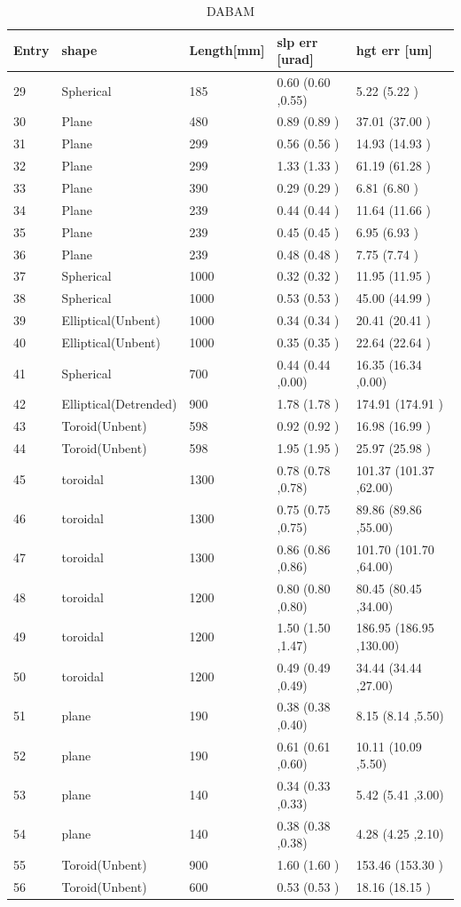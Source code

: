 \documentclass[../main.tex]{subfiles}
\begin{document}
	\begin{table}[h!]
	\centering
	\caption{DABAM}
	\label{my-label}
	\begin{tabular}{lllll}
	\textbf{Entry} & \textbf{shape} & \textbf{Length[mm]} & \textbf{slp err [urad]} & \textbf{hgt err [um]}\\
	\hline
	29 & Spherical & 185 & 0.60  (0.60 ,0.55) & 5.22  (5.22 ) \\
	30 & Plane & 480 & 0.89  (0.89 ) & 37.01  (37.00 ) \\
	31 & Plane & 299 & 0.56  (0.56 ) & 14.93  (14.93 ) \\
	32 & Plane & 299 & 1.33  (1.33 ) & 61.19  (61.28 ) \\
	33 & Plane & 390 & 0.29  (0.29 ) & 6.81  (6.80 ) \\
	34 & Plane & 239 & 0.44  (0.44 ) & 11.64  (11.66 ) \\
	35 & Plane & 239 & 0.45  (0.45 ) & 6.95  (6.93 ) \\
	36 & Plane & 239 & 0.48  (0.48 ) & 7.75  (7.74 ) \\
	37 & Spherical & 1000 & 0.32  (0.32 ) & 11.95  (11.95 ) \\
	38 & Spherical & 1000 & 0.53  (0.53 ) & 45.00  (44.99 ) \\
	39 & Elliptical(Unbent) & 1000 & 0.34  (0.34 ) & 20.41  (20.41 ) \\
	40 & Elliptical(Unbent) & 1000 & 0.35  (0.35 ) & 22.64  (22.64 ) \\
	41 & Spherical & 700 & 0.44  (0.44 ,0.00) & 16.35  (16.34 ,0.00) \\
	42 & Elliptical(Detrended) & 900 & 1.78  (1.78 ) & 174.91  (174.91 ) \\
	43 & Toroid(Unbent) & 598 & 0.92  (0.92 ) & 16.98  (16.99 ) \\
	44 & Toroid(Unbent) & 598 & 1.95  (1.95 ) & 25.97  (25.98 ) \\
	45 & toroidal & 1300 & 0.78  (0.78 ,0.78) & 101.37  (101.37 ,62.00) \\
	46 & toroidal & 1300 & 0.75  (0.75 ,0.75) & 89.86  (89.86 ,55.00) \\
	47 & toroidal & 1300 & 0.86  (0.86 ,0.86) & 101.70  (101.70 ,64.00) \\
	48 & toroidal & 1200 & 0.80  (0.80 ,0.80) & 80.45  (80.45 ,34.00) \\
	49 & toroidal & 1200 & 1.50  (1.50 ,1.47) & 186.95  (186.95 ,130.00) \\
	50 & toroidal & 1200 & 0.49  (0.49 ,0.49) & 34.44  (34.44 ,27.00) \\
	51 & plane & 190 & 0.38  (0.38 ,0.40) & 8.15  (8.14 ,5.50) \\
	52 & plane & 190 & 0.61  (0.61 ,0.60) & 10.11  (10.09 ,5.50) \\
	53 & plane & 140 & 0.34  (0.33 ,0.33) & 5.42  (5.41 ,3.00) \\
	54 & plane & 140 & 0.38  (0.38 ,0.38) & 4.28  (4.25 ,2.10) \\
	55 & Toroid(Unbent) & 900 & 1.60  (1.60 ) & 153.46  (153.30 ) \\
	56 & Toroid(Unbent) & 600 & 0.53  (0.53 ) & 18.16  (18.15 ) \\
	\end{tabular}
	\end{table}
\end{document}

